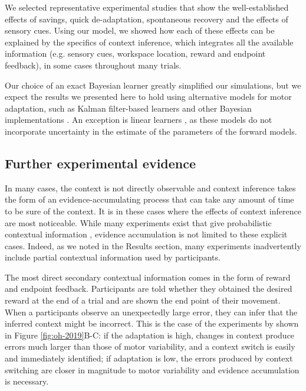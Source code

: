 \documentclass[a4paper,doc,floatsintext,natbib]{apa6}%
\def \fref #1{Figure \ref{#1}}     %
\begin{document}
We selected representative experimental studies that show the well-established effects of savings, quick de-adaptation, spontaneous recovery and the effects of sensory cues. Using our model, we showed how each of these effects can be explained by the specifics of context inference, which integrates all the available information (e.g. sensory cues, workspace location, reward and endpoint feedback), in some cases throughout many trials.

Our choice of an exact Bayesian learner greatly simplified our simulations, but we expect the results we presented here to hold using alternative models for motor adaptation, such as Kalman filter-based learners \cite[e.g.][]{Oh_Minimizing_2019,Baddeley_System_2003} and other Bayesian implementations \cite[e.g.][]{Wolpert_Multiple_1998,Kording_Bayesian_2004}. An exception is linear learners \cite[e.g.][]{Smith_Interacting_2006,Forano_Timescales_2020,Lee_Dual_2009}, as these models do not incorporate uncertainty in the estimate of the parameters of the forward models.

\subsection{Further experimental evidence}
In many cases, the context is not directly observable and context inference takes the form of an evidence-accumulating process that can take any amount of time to be sure of the context. It is in these cases where the effects of context inference are most noticeable. While many experiments exist that give probabilistic contextual information \cite[e.g.][]{Scholz_uncontrolled_1999,Behrens_Learning_2007,Nassar_Dissociable_2019}, evidence accumulation is not limited to these explicit cases. Indeed, as we noted in the Results section, many experiments inadvertently include partial contextual information used by participants.

The most direct secondary contextual information comes in the form of reward and endpoint feedback. Participants are told whether they obtained the desired reward at the end of a trial and are shown the end point of their movement. When a participants observe an unexpectedly large error, they can infer that the inferred context might be incorrect. This is the case of the experiments by \cite{Oh_Minimizing_2019} shown in \fref{fig:oh-2019}B-C: if the adaptation is high, changes in context produce errors much larger than those of motor variability, and a context switch is easily and immediately identified; if adaptation is low, the errors produced by context switching are closer in magnitude to motor variability and evidence accumulation is necessary.
\end{document}
